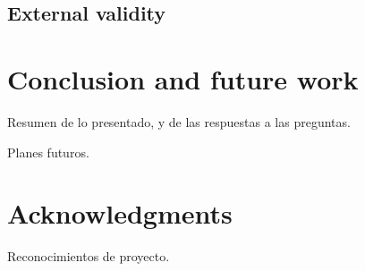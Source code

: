 \subsection{External validity}



\section{Conclusion and future work}

Resumen de lo presentado, y de las respuestas a las preguntas.

Planes futuros.

\section*{Acknowledgments}

Reconocimientos de proyecto.



\appendix



